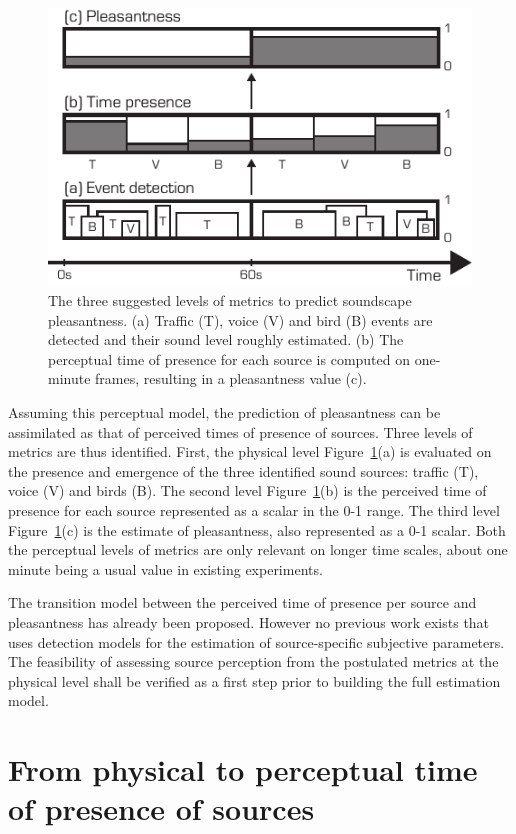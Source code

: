 \documentclass{article}
\begin{document}
\begin{sloppy}
\begin{figure}[t]
  \centering
  \centerline{\includegraphics[width=0.8\columnwidth]{block.pdf}}
  \caption{The three suggested levels of metrics to predict soundscape pleasantness. (a) Traffic (T), voice (V) and bird (B) events are detected and their sound level roughly estimated. (b) The perceptual time of presence for each source is computed on one-minute frames, resulting in a pleasantness value (c).}
  \label{fig:block}
\end{figure}

Assuming this perceptual model, the prediction of pleasantness can be assimilated as that of perceived times of presence of sources. Three levels of metrics are thus identified. First, the physical level Figure~\ref{fig:block}(a) is evaluated on the presence and emergence of the three identified sound sources: traffic (T), voice (V) and birds (B). The second level Figure~\ref{fig:block}(b) is the perceived time of presence for each source represented as a scalar in the 0-1 range. The third level Figure~\ref{fig:block}(c) is the estimate of pleasantness, also represented as a 0-1 scalar. Both the perceptual levels of metrics are only relevant on longer time scales, about one minute being a usual value in existing experiments.

The transition model between the perceived time of presence per source and pleasantness has already been proposed. However no previous work exists that uses detection models for the estimation of source-specific subjective parameters. The feasibility of assessing source perception from the postulated metrics at the physical level shall be verified as a first step prior to building the full estimation model.

\section{From physical to perceptual time of presence of sources}
\label{sec:val}


\end{sloppy}
\end{document}
